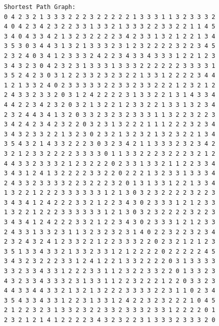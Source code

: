 \documentclass[11pt]{article}
\begin{document}
\begin{lstlisting}
Shortest Path Graph:
0 4 2 3 2 1 3 3 3 2 2 2 3 2 2 2 2 2 1 3 3 3 1 1 3 2 3 3 3 2
4 0 4 2 3 4 2 3 2 2 3 3 1 3 3 2 1 3 3 3 2 2 3 3 2 2 1 1 4 5
3 4 0 4 3 3 4 2 1 3 2 3 2 2 2 2 3 4 2 3 3 1 3 2 1 2 2 1 3 4
3 5 3 0 3 4 4 3 1 3 2 1 3 3 3 2 3 1 2 3 2 2 2 2 3 2 2 3 4 5
2 3 2 4 0 3 4 1 2 3 3 3 2 4 2 2 3 4 3 3 4 3 3 3 1 2 2 1 2 3
3 4 3 2 3 0 4 2 3 2 3 1 3 3 3 1 3 3 3 2 2 2 2 2 2 3 3 3 3 1
3 5 2 4 2 3 0 3 1 2 2 3 3 2 3 2 3 2 2 1 3 3 1 2 2 2 2 3 4 4
1 2 1 3 3 2 4 0 2 3 3 3 3 3 2 2 3 3 2 3 3 2 2 2 1 2 3 2 1 2
2 4 3 3 2 3 3 2 0 3 1 2 4 2 2 2 2 3 1 3 3 2 2 1 3 1 4 3 3 4
4 4 2 2 3 4 2 3 2 0 3 2 1 3 2 2 1 2 3 3 2 2 1 3 3 1 3 2 3 4
2 3 2 4 4 3 4 1 3 2 0 3 3 2 3 2 3 2 3 3 3 1 1 3 2 2 3 2 2 3
3 4 2 4 2 3 4 2 3 2 2 0 3 2 3 1 3 2 2 2 1 1 1 2 2 2 3 2 3 4
3 4 3 2 3 3 2 2 1 3 2 3 0 2 3 2 1 3 2 3 2 1 3 2 3 2 2 1 3 4
3 5 4 3 2 1 4 3 3 2 2 2 3 0 3 2 3 4 2 1 1 3 3 3 2 3 2 3 4 2
3 2 1 2 3 3 2 2 2 2 3 3 3 3 0 1 1 3 3 2 2 2 3 2 2 2 3 2 1 2
4 4 3 3 2 3 3 3 2 1 2 3 2 2 2 0 2 3 3 1 3 3 2 1 1 2 2 3 3 4
3 4 3 1 2 4 1 3 2 2 2 2 3 3 2 2 0 2 2 2 1 3 2 3 3 1 3 3 3 4
2 4 3 3 2 3 3 3 3 2 2 3 2 2 2 3 2 0 1 3 1 3 3 1 2 2 1 3 3 4
1 3 2 2 1 2 2 2 3 3 3 3 3 3 1 2 1 3 0 3 2 3 2 2 2 2 3 2 2 3
3 4 3 4 1 2 4 2 2 2 3 3 2 1 2 2 3 4 3 0 2 3 3 3 1 2 1 2 3 3
1 3 2 2 1 2 2 2 3 3 3 3 3 3 1 2 1 3 0 3 2 3 2 2 2 2 3 2 2 3
3 4 3 4 1 2 4 2 2 2 3 3 2 1 2 2 3 4 3 0 2 3 3 3 1 2 1 2 3 3
2 4 3 3 1 3 3 2 3 1 1 3 2 3 2 3 2 3 1 4 0 2 2 3 2 2 3 2 3 4
2 3 2 4 3 2 4 1 2 3 3 2 2 1 2 2 3 3 3 2 2 0 2 3 2 1 2 1 2 3
3 5 1 3 3 4 3 3 2 1 3 3 2 3 3 1 2 1 2 2 2 2 0 2 2 2 2 2 4 5
3 4 3 2 3 2 2 2 3 3 1 2 4 1 2 2 1 3 3 2 2 2 2 0 3 1 3 3 3 3
3 3 2 3 3 4 3 3 1 2 2 2 3 3 1 1 2 3 2 2 3 3 2 2 0 1 3 3 2 3
4 3 2 3 3 4 3 3 3 2 3 1 3 3 1 1 2 2 3 2 2 2 1 2 2 0 3 3 2 3
4 4 3 3 4 4 3 3 2 1 3 2 1 3 2 2 2 3 3 3 3 2 2 3 1 1 0 2 3 4
3 5 4 3 3 4 3 3 1 2 2 3 1 3 3 1 2 4 2 2 3 2 3 2 2 2 1 0 4 5
2 1 2 2 3 2 3 1 3 3 2 3 2 2 3 3 2 3 3 3 2 3 3 1 2 2 2 2 0 1
2 3 2 1 2 1 4 1 2 2 2 2 3 4 3 2 3 2 2 3 1 3 3 3 2 3 3 3 2 0


\end{lstlisting}
\end{document}
